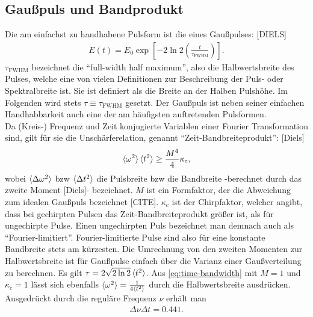 \documentclass[twoside,        %
               BCOR12mm,       %
               english,ngerman, %
               fleqn,headsepline=false,footsepline=false
              ]{Vorlage/MFPREPORT}
\begin{document}
\subsection{Gaußpuls und Bandprodukt}
\label{seq:bandprod}
Die am einfachst zu handhabene Pulsform ist die eines Gaußpulses: [DIELS]
\begin{align}
    E(t)=E_0\exp\left[-2\ln 2\left(\frac{t}{\tau_{\text{FWHM}}}\right)\right].
    \label{eq:gaus}
\end{align}
$\tau_{\text{FWHM}}$ bezeichnet die ``full-width half maximum'', also die Halbwertsbreite des Pulses, welche eine von vielen Definitionen zur Beschreibung der Puls- oder Spektralbreite ist. Sie ist definiert als die Breite an der Halben Pulshöhe. Im Folgenden wird stets $\tau\equiv\tau_{\text{FWHM}}$ gesetzt. Der Gaußpuls ist neben seiner einfachen Handhabbarkeit auch eine der am häufigsten auftretenden Pulsformen.\\
Da (Kreis-) Frequenz und Zeit konjugierte Variablen einer Fourier Transformation sind, gilt für sie die Unschärferelation, genannt ``Zeit-Bandbreiteprodukt'': [Diels]
\begin{align}
    \braket{\omega^{2}}\braket{t^{2}} \geq \frac{M^{4}}{4}\kappa_c,
    \label{eq:time-bandwidth}
\end{align}
wobei $\braket{\Delta\omega^{2}}$ bzw $\braket{\Delta t^{2}}$ die Pulsbreite bzw die Bandbreite -berechnet durch das zweite Moment [Diels]- bezeichnet. $M$ ist ein Formfaktor, der die Abweichung zum idealen Gaußpuls bezeichnet [CITE]. $\kappa_c$ ist der Chirpfaktor, welcher angibt, dass bei gechirpten Pulsen das Zeit-Bandbreiteprodukt größer ist, als für ungechirpte Pulse. Einen ungechirpten Puls bezeichnet man demnach auch als ``Fourier-limitiert''. Fourier-limitierte Pulse sind also für eine konstante Bandbreite stets am kürzesten.
Die Umrechnung von den zweiten Momenten zur Halbwertsbreite ist für Gaußpulse
einfach über die Varianz einer Gaußverteilung zu berechnen. Es gilt
$\tau=2\sqrt{2 \ln 2}\braket{t^2}$. Aus \cref{eq:time-bandwidth} mit $M=1$ und
$\kappa_c=1$ lässt sich ebenfalls $\braket{\omega^2}=\frac{1}{4 \braket{t^2}}$
durch die Halbwertsbreite ausdrücken. Ausgedrückt durch die reguläre Frequenz
$\nu$
erhält man
\begin{align}
    \label{eq:bandprodeasy}
    \Delta \nu \Delta t = 0.441.
\end{align}
\end{document}
